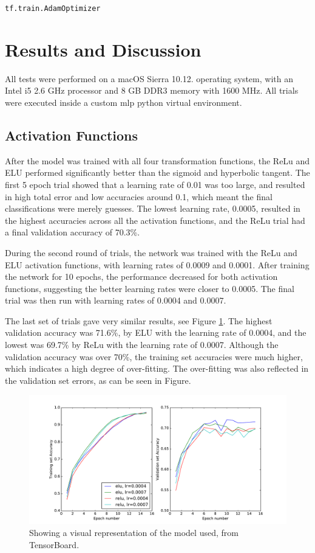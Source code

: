 \documentclass[]{article}
\begin{document}
\texttt{tf.train.AdamOptimizer}
 
\section{Results and Discussion}

All tests were performed on a macOS Sierra 10.12. operating system, with an Intel i5 2.6 GHz processor and 8 GB DDR3 memory with 1600 MHz. All trials were executed inside a custom mlp python virtual environment. 

\subsection{Activation Functions}

After the model was trained with all four transformation functions, the ReLu and ELU performed significantly better than the sigmoid and hyperbolic tangent. The first 5 epoch trial showed that a learning rate of 0.01 was too large, and resulted in high total error and low accuracies around 0.1, which meant the final classifications were merely guesses. The lowest learning rate, 0.0005, resulted in the highest accuracies across all the activation functions, and the ReLu trial had a final validation accuracy of 70.3\%. 

During the second round of trials, the network was trained with the ReLu and ELU activation functions, with learning rates of 0.0009 and 0.0001. After training the network for 10 epochs, the performance decreased for both activation functions, suggesting the better learning rates were closer to 0.0005. The final trial was then run with learning rates of 0.0004 and 0.0007. 

The last set of trials gave very similar results, see Figure \ref{ac_res}. The highest validation accuracy was 71.6\%, by ELU with the learning rate of 0.0004, and the lowest was 69.7\% by ReLu with the learning rate of 0.0007. Although the validation accuracy was over 70\%, the training set accuracies were much higher, which indicates a high degree of over-fitting. The over-fitting was also reflected in the validation set errors, as can be seen in Figure. 

\begin{figure}[h]
	\includegraphics[width=\textwidth]{ac_res}
	\caption{Showing a visual representation of the model used, from TensorBoard.}
	\label{ac_res}
	\centering
\end{figure}
\end{document}
